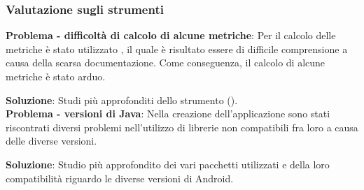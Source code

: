 \subsubsection{Valutazione sugli strumenti}

\textbf{Problema - difficoltà di calcolo di alcune metriche}: Per il calcolo delle metriche è stato utilizzato , il quale è risultato essere di difficile comprensione a causa della scarsa documentazione. Come conseguenza, il calcolo di alcune metriche è stato arduo.

\textbf{Soluzione}: Studi più approfonditi dello strumento ().\\

\textbf{Problema - versioni di Java}: Nella creazione dell'applicazione sono stati riscontrati diversi problemi nell'utilizzo di librerie non compatibili fra loro a causa delle diverse versioni.

\textbf{Soluzione}: Studio più approfondito dei vari pacchetti utilizzati e della loro compatibilità riguardo le diverse versioni di Android.


